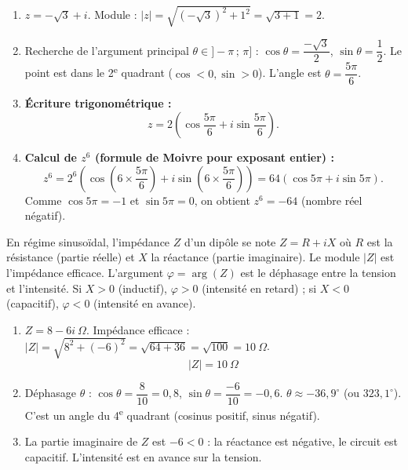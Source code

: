 \documentclass[11pt]{article}
\newcommand{\cle}[1]{{\popxbold\color{popdark}#1}}
\begin{document}
\begin{corrige}
\begin{enumerate}
\item $z = -\sqrt{3} + i$. Module : $|z| = \sqrt{(-\sqrt{3})^2 + 1^2} = \sqrt{3+1} = 2$.
\item Recherche de l'argument principal $\theta \in ]-\pi\,;\,\pi]$ :
$\cos\theta = \dfrac{-\sqrt{3}}{2}$, $\sin\theta = \dfrac{1}{2}$.
Le point est dans le 2\textsuperscript{e} quadrant ($\cos < 0, \sin > 0$). L'angle est $\theta = \dfrac{5\pi}{6}$.
\item \textbf{Écriture trigonométrique :}
\[ z = 2\left(\cos\dfrac{5\pi}{6} + i\sin\dfrac{5\pi}{6}\right). \]
\item \textbf{Calcul de $z^6$ (formule de Moivre pour exposant entier) :}
\[ z^6 = 2^6\left(\cos\left(6 \times \dfrac{5\pi}{6}\right) + i\sin\left(6 \times \dfrac{5\pi}{6}\right)\right) = 64\left(\cos 5\pi + i\sin 5\pi\right). \]
Comme $\cos 5\pi = -1$ et $\sin 5\pi = 0$, on obtient $z^6 = -64$ (nombre réel négatif).
\end{enumerate}
\end{corrige}

\begin{corrige}
\begin{savaistu}
En régime sinusoïdal, l'impédance $Z$ d'un dipôle se note $Z = R + iX$ où $R$ est la résistance (partie réelle) et $X$ la réactance (partie imaginaire). Le module $|Z|$ est l'impédance efficace. L'argument $\varphi = \arg(Z)$ est le \cle{déphasage} entre la tension et l'intensité. Si $X > 0$ (inductif), $\varphi > 0$ (intensité en retard) ; si $X < 0$ (capacitif), $\varphi < 0$ (intensité en avance).
\end{savaistu}
\begin{enumerate}
\item $Z = 8 - 6i\ \Omega$. Impédance efficace : $|Z| = \sqrt{8^2 + (-6)^2} = \sqrt{64 + 36} = \sqrt{100} = 10\ \Omega$.
  \[ \boxed{|Z| = \SI{10}{\Omega}} \]
\item Déphasage $\theta$ : $\cos\theta = \dfrac{8}{10} = 0,8$, $\sin\theta = \dfrac{-6}{10} = -0,6$.
  $\theta \approx -36,9^\circ$ (ou $323,1^\circ$). C'est un angle du 4\textsuperscript{e} quadrant (cosinus positif, sinus négatif).
\item La partie imaginaire de $Z$ est $-6 < 0$ : la réactance est négative, le circuit est \cle{capacitif}. L'intensité est en avance sur la tension.
\end{enumerate}
\end{corrige}
\end{document}
